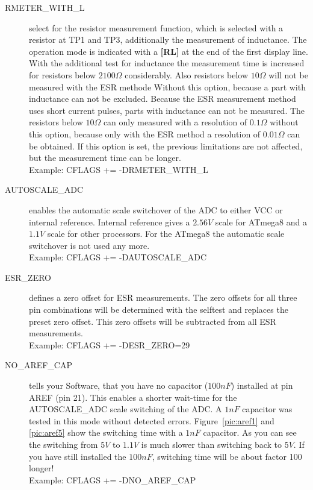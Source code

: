 \begin{description}
  \item[RMETER\_WITH\_L] select for the resistor measurement function, which is selected with a resistor at TP1 and TP3,
additionally the measurement of inductance. The operation mode is indicated with a \textbf{[RL]} at the end of the first display line.
With the additional test for inductance the measurement time is increased for resistors below \(2100\Omega\) considerably.
Also resistors below \(10\Omega\) will not be measured with the ESR methode Without this option, because
a part with inductance can not be excluded. Because the ESR measurement method  uses short current pulses,
parts with inductance can not be measured. The resistors below \(10\Omega\) can only measured with a resolution of
\(0.1\Omega\) without this option, because only with the ESR method a resolution of \(0.01\Omega\) can be obtained.
If this option is set, the previous limitations are not affected, but the measurement time can be longer.\\
Example: CFLAGS += -DRMETER\_WITH\_L

  \item[AUTOSCALE\_ADC] enables the automatic scale switchover of the ADC to either VCC or internal reference.
Internal reference gives a \(2.56V\) scale for ATmega8 and a \(1.1V\) scale for other processors.
For the ATmega8 the automatic scale switchover is not used any more.\\
Example: CFLAGS += -DAUTOSCALE\_ADC

  \item[ESR\_ZERO] defines a zero offset for ESR measurements.
The zero offsets for all three pin combinations will be determined with the selftest and replaces the preset zero offset.
This zero offsets will be subtracted from all ESR measurements.\\
Example: CFLAGS += -DESR\_ZERO=29

  \item[NO\_AREF\_CAP] tells your Software, that you have no capacitor (\(100nF\)) installed at pin AREF (pin 21).
This enables a shorter wait-time for the AUTOSCALE\_ADC scale switching of the ADC.
A \(1nF\) capacitor was tested in this mode without detected errors.
Figure~\ref{pic:aref1} and \ref{pic:aref5} show the switching time with a \(1nF\) capacitor.
As you can see the switching from \(5V\) to \(1.1V\) is much slower than switching back to \(5V\). If you
have still installed the \(100nF\), switching time will be about factor 100 longer!\\
Example: CFLAGS += -DNO\_AREF\_CAP
\end{description}
